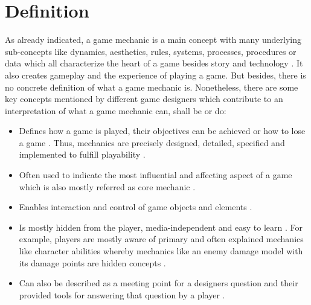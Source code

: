 \documentclass[MGS,Master,english]{twbook}%
\begin{document}
\section{Definition}
As already indicated, a game mechanic is a main concept with many underlying sub-concepts like dynamics, aesthetics, rules, systems, processes, procedures or data which all characterize the heart of a game besides story and technology \cite{gameDesign::gameMechanicsAdvancedGameDesign} \cite{gameDesign::bookOfLenses}. It also creates gameplay and the experience of playing a game. But besides, there is no concrete definition of what a game mechanic is. Nonetheless, there are some key concepts mentioned by different game designers which contribute to an interpretation of what a game mechanic can, shall be or do:
\begin{itemize}
	\item Defines how a game is played, their objectives can be achieved or how to lose a game \cite{gameDesign::bookOfLenses}. Thus, mechanics are precisely designed, detailed, specified and implemented to fulfill playability \cite{gameDesign::gameMechanicsAdvancedGameDesign} \cite{gameDesign::bookOfLenses}. 
	\item Often used to indicate the most influential and affecting aspect of a game which is also mostly referred as core mechanic \cite{gameDesign::gameMechanicsAdvancedGameDesign}. 
	\item Enables interaction and control of game objects and elements \cite{gameDesign::gameMechanicsAdvancedGameDesign}.
	\item Is mostly hidden from the player, media-independent and easy to learn \cite{gameDesign::gameMechanicsAdvancedGameDesign}. For example, players are mostly aware of primary and often explained mechanics like character abilities whereby mechanics like an enemy damage model with its damage points are hidden concepts \cite{gameDesign::gameMechanicsAdvancedGameDesign}.
	\item Can also be described as a meeting point for a designers question and their provided tools for answering that question by a player \cite{mechanic::gamasutra::MikeStout}. 
\end{itemize}
\end{document}
